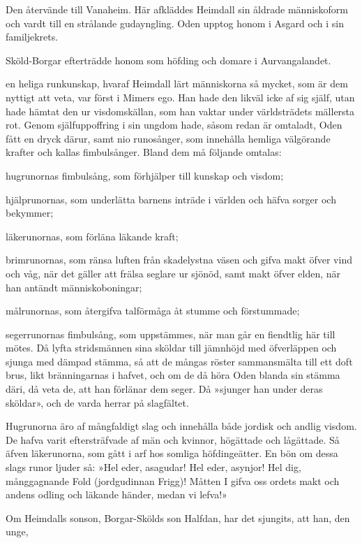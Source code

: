 Den återvände till Vanaheim. Här afkläddes Heimdall sin åldrade
människoform och vardt till en strålande gudayngling. Oden upptog honom
i Asgard och i sin familjekrets.

Sköld-Borgar efterträdde honom som höfding och domare i Aurvangalandet.

\endSecII


\dropcapD en heliga runkunskap, hvaraf Heimdall lärt människorna så mycket, som
är dem nyttigt att veta, var först i Mimers ego. Han hade den likväl
icke af sig själf, utan hade hämtat den ur visdomskällan, som han vaktar
under världsträdets mällersta rot. Genom själfuppoffring i sin ungdom
hade, såsom redan är omtaladt, Oden fått en dryck därur, samt nio
runosånger, som innehålla hemliga välgörande krafter och kallas
fimbulsånger. Bland dem må följande omtalas:

hugrunornas fimbulsång, som förhjälper till kunskap och visdom;

hjälprunornas, som underlätta barnens inträde i världen och häfva sorger
och bekymmer;

läkerunornas, som förläna läkande kraft;

brimrunornas, som ränsa luften från skadelystna väsen
och gifva makt öfver vind och våg, när det gäller att frälsa seglare ur
sjönöd, samt makt öfver elden, när han antändt människoboningar;

målrunornas, som återgifva talförmåga åt stumme och förstummade;

segerrunornas fimbulsång, som uppstämmes, när man går en fiendtlig här
till mötes. Då lyfta stridsmännen sina sköldar till jämnhöjd med
öfverläppen och sjunga med dämpad stämma, så att de mångas röster
sammansmälta till ett doft brus, likt bränningarnas i hafvet, och om de
då höra Oden blanda sin stämma däri, då veta de, att han förlänar dem
seger. Då »sjunger han under deras sköldar», och de varda herrar på
slagfältet.

Hugrunorna äro af mångfaldigt slag och innehålla både jordisk och andlig
visdom. De hafva varit eftersträfvade af män och kvinnor, högättade och
lågättade. Så äfven läkerunorna, som gått i arf hos somliga
höfdingeätter. En bön om dessa slags runor ljuder så: »Hel eder,
asagudar! Hel eder, asynjor! Hel dig, månggagnande Fold (jordgudinnan
Frigg)! Måtten I gifva oss ordets makt och andens odling och läkande
händer, medan vi lefva!»

Om Heimdalls sonson, Borgar-Skölds son Halfdan, har det sjungits, att
han, den unge,

